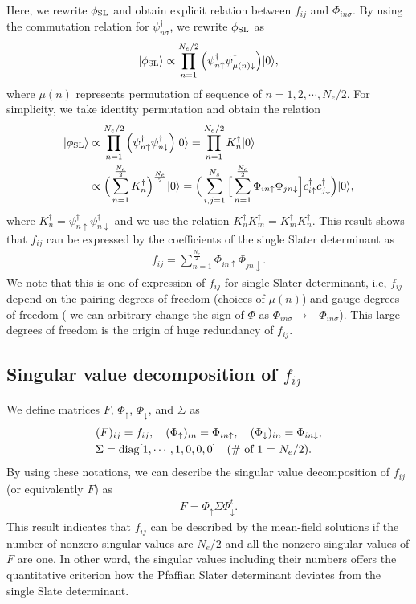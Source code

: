 Here, we rewrite $\phi_{\rm SL}$ and obtain explicit 
relation between $f_{ij}$ and $\Phi_{in\sigma}$.
By using the commutation relation for $\psi^{\dagger}_{n\sigma}$,
we rewrite $\phi_{\rm SL}$ as 
\begin{align}
|\phi_{\rm SL}\rangle \propto \prod_{n=1}^{N_{e}/2}\Big(\psi_{n\uparrow}^{\dagger}\psi_{\mu(n)\downarrow}^{\dagger}\Big)|0\rangle,
\end{align}
where $\mu(n)$ represents permutation of sequence of $n= 1, 2, \cdots, N_{e}/2$.
For simplicity, we take identity permutation and obtain the relation 
\begin{align}
|\phi_{\rm SL}\rangle &\propto \prod_{n=1}^{N_{e}/2}\Big(\psi_{n\uparrow}^{\dagger}\psi_{n\downarrow}^{\dagger}\Big)|0\rangle
=\prod_{n=1}^{N_{e}/2} K_{n}^{\dagger}|0\rangle \\
&\propto\Big(\sum_{n=1}^{\frac{N_{e}}{2}}K_{n}^{\dagger}\Big)^{\frac{N_{e}}{2}} |0\rangle
=\Big(\sum_{i,j=1}^{N_{s}}\Big[\sum_{n=1}^{\frac{N_{e}}{2}}\Phi_{in\uparrow}\Phi_{jn\downarrow}\Big]
c_{i\uparrow}^{\dagger}c_{j\downarrow}^{\dagger}\Big)|0\rangle,
\end{align}
where $K_{n}^{\dagger}=\psi_{n\uparrow}^{\dagger}\psi_{n\downarrow}^{\dagger}$ and
we use the relation  $K_{n}^{\dagger}K_{m}^{\dagger}=K_{m}^{\dagger}K_{n}^{\dagger}$.
This result shows that $f_{ij}$ can be expressed by the 
coefficients of the single Slater determinant as
\begin{align}
f_{ij}=\sum_{n=1}^{\frac{N_{e}}{2}}\Phi_{in\uparrow}\Phi_{jn\downarrow}.
\end{align}
We note that this is one of expression of $f_{ij}$ for 
single Slater determinant, i.e, $f_{ij}$ depend on
the pairing degrees of freedom (choices  of $\mu(n)$) and
gauge degrees of freedom ( we can arbitrary change
the sign of $\Phi$ as $\Phi_{in\sigma}\rightarrow -\Phi_{in\sigma}$).
This large degrees of freedom is the origin of huge redundancy of
$f_{ij}$.

\subsection{Singular value decomposition of $f_{ij}$}
We define matrices $F$, $\Phi_{\uparrow}$, $\Phi_{\downarrow}$, and $\Sigma$ as
\begin{align}
&(F)_{ij}=f_{ij},~~~ 
(\Phi_{\uparrow})_{in}=\Phi_{in\uparrow},~~~ 
(\Phi_{\downarrow})_{in}=\Phi_{in\downarrow}, \\
&\Sigma={\rm diag}[1,\cdots,1,0,0,0]~~~\text{({\rm \# of 1} = $N_{e}/2$)}.
\end{align}
By using these notations, we can describe the
singular value decomposition of $f_{ij}$ (or equivalently $F$) as 
\begin{align}
F=\Phi_{\uparrow}\Sigma\Phi_{\downarrow}^{t}.
\end{align}
This result indicates that $f_{ij}$ can be 
described by the mean-field solutions
if the number of
nonzero singular values are $N_{e}/2$ and
all the nonzero singular values of $F$ are one.
In other word, the singular values including their numbers
offers the quantitative criterion how the Pfaffian Slater determinant
deviates from the single Slate determinant.


